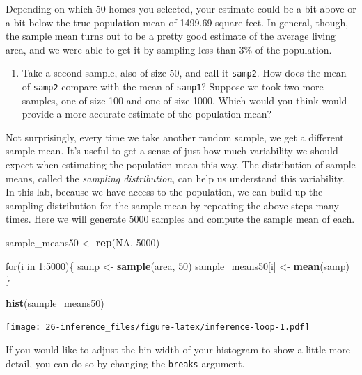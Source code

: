 \documentclass[]{book}
\newenvironment{Shaded}{\begin{snugshade}}{\end{snugshade}}
\newcommand{\KeywordTok}[1]{\textcolor[rgb]{0.13,0.29,0.53}{\textbf{{#1}}}}
\newcommand{\DecValTok}[1]{\textcolor[rgb]{0.00,0.00,0.81}{{#1}}}
\newcommand{\StringTok}[1]{\textcolor[rgb]{0.31,0.60,0.02}{{#1}}}
\newcommand{\OtherTok}[1]{\textcolor[rgb]{0.56,0.35,0.01}{{#1}}}
\newcommand{\NormalTok}[1]{{#1}}
\providecommand{\tightlist}{%
  \setlength{\itemsep}{0pt}\setlength{\parskip}{0pt}}
\theoremstyle{definition}
\theoremstyle{definition}
\theoremstyle{remark}
\begin{document}
Depending on which 50 homes you selected, your estimate could be a bit
above or a bit below the true population mean of 1499.69 square feet. In
general, though, the sample mean turns out to be a pretty good estimate
of the average living area, and we were able to get it by sampling less
than 3\% of the population.

\begin{enumerate}
\def\labelenumi{\arabic{enumi}.}
\setcounter{enumi}{2}
\tightlist
\item
  Take a second sample, also of size 50, and call it \texttt{samp2}. How
  does the mean of \texttt{samp2} compare with the mean of
  \texttt{samp1}? Suppose we took two more samples, one of size 100 and
  one of size 1000. Which would you think would provide a more accurate
  estimate of the population mean?
\end{enumerate}

Not surprisingly, every time we take another random sample, we get a
different sample mean. It's useful to get a sense of just how much
variability we should expect when estimating the population mean this
way. The distribution of sample means, called the \emph{sampling
distribution}, can help us understand this variability. In this lab,
because we have access to the population, we can build up the sampling
distribution for the sample mean by repeating the above steps many
times. Here we will generate 5000 samples and compute the sample mean of
each.

\begin{Shaded}
\begin{Highlighting}[]
\NormalTok{sample_means50 <-}\StringTok{ }\KeywordTok{rep}\NormalTok{(}\OtherTok{NA}\NormalTok{, }\DecValTok{5000}\NormalTok{)}

\NormalTok{for(i in }\DecValTok{1}\NormalTok{:}\DecValTok{5000}\NormalTok{)\{}
   \NormalTok{samp <-}\StringTok{ }\KeywordTok{sample}\NormalTok{(area, }\DecValTok{50}\NormalTok{)}
   \NormalTok{sample_means50[i] <-}\StringTok{ }\KeywordTok{mean}\NormalTok{(samp)}
   \NormalTok{\}}

\KeywordTok{hist}\NormalTok{(sample_means50)}
\end{Highlighting}
\end{Shaded}

\texttt{[image: 26-inference\_files/figure-latex/inference-loop-1.pdf]}

If you would like to adjust the bin width of your histogram to show a
little more detail, you can do so by changing the \texttt{breaks}
argument.
\end{document}
